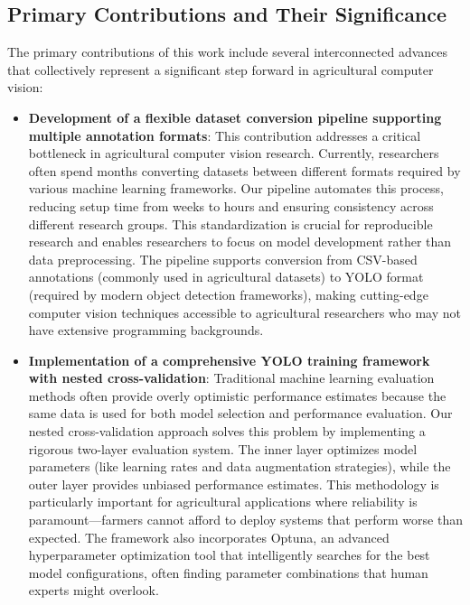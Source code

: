 \subsection{Primary Contributions and Their Significance}

The primary contributions of this work include several interconnected advances that collectively represent a significant step forward in agricultural computer vision:

\begin{itemize}
    \item \textbf{Development of a flexible dataset conversion pipeline supporting multiple annotation formats}: This contribution addresses a critical bottleneck in agricultural computer vision research. Currently, researchers often spend months converting datasets between different formats required by various machine learning frameworks. Our pipeline automates this process, reducing setup time from weeks to hours and ensuring consistency across different research groups. This standardization is crucial for reproducible research and enables researchers to focus on model development rather than data preprocessing. The pipeline supports conversion from CSV-based annotations (commonly used in agricultural datasets) to YOLO format (required by modern object detection frameworks), making cutting-edge computer vision techniques accessible to agricultural researchers who may not have extensive programming backgrounds.
    
    \item \textbf{Implementation of a comprehensive YOLO training framework with nested cross-validation}: Traditional machine learning evaluation methods often provide overly optimistic performance estimates because the same data is used for both model selection and performance evaluation. Our nested cross-validation approach solves this problem by implementing a rigorous two-layer evaluation system. The inner layer optimizes model parameters (like learning rates and data augmentation strategies), while the outer layer provides unbiased performance estimates. This methodology is particularly important for agricultural applications where reliability is paramount—farmers cannot afford to deploy systems that perform worse than expected. The framework also incorporates Optuna, an advanced hyperparameter optimization tool that intelligently searches for the best model configurations, often finding parameter combinations that human experts might overlook.
    

\end{itemize}
